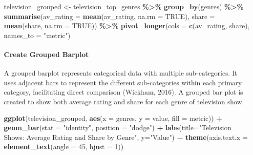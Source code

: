 \documentclass[
  b5paper]{book}
\newenvironment{Shaded}{\begin{snugshade}}{\end{snugshade}}
\newcommand{\AttributeTok}[1]{\textcolor[rgb]{0.13,0.29,0.53}{#1}}
\newcommand{\ConstantTok}[1]{\textcolor[rgb]{0.56,0.35,0.01}{#1}}
\newcommand{\DecValTok}[1]{\textcolor[rgb]{0.00,0.00,0.81}{#1}}
\newcommand{\FunctionTok}[1]{\textcolor[rgb]{0.13,0.29,0.53}{\textbf{#1}}}
\newcommand{\NormalTok}[1]{#1}
\newcommand{\OtherTok}[1]{\textcolor[rgb]{0.56,0.35,0.01}{#1}}
\newcommand{\SpecialCharTok}[1]{\textcolor[rgb]{0.81,0.36,0.00}{\textbf{#1}}}
\newcommand{\StringTok}[1]{\textcolor[rgb]{0.31,0.60,0.02}{#1}}
\begin{document}
\begin{Shaded}
\begin{Highlighting}[]
\NormalTok{television\_grouped }\OtherTok{\textless{}{-}}\NormalTok{ television\_top\_genres }\SpecialCharTok{\%\textgreater{}\%}
  \FunctionTok{group\_by}\NormalTok{(genres) }\SpecialCharTok{\%\textgreater{}\%}
  \FunctionTok{summarise}\NormalTok{(}\AttributeTok{av\_rating =} \FunctionTok{mean}\NormalTok{(av\_rating, }\AttributeTok{na.rm =} \ConstantTok{TRUE}\NormalTok{),}
            \AttributeTok{share =} \FunctionTok{mean}\NormalTok{(share, }\AttributeTok{na.rm =} \ConstantTok{TRUE}\NormalTok{)) }\SpecialCharTok{\%\textgreater{}\%}
  \FunctionTok{pivot\_longer}\NormalTok{(}\AttributeTok{cols =} \FunctionTok{c}\NormalTok{(av\_rating, share), }\AttributeTok{names\_to =} \StringTok{"metric"}\NormalTok{)}
\end{Highlighting}
\end{Shaded}

\hypertarget{create-grouped-barplot}{%
\paragraph*{Create Grouped Barplot}\label{create-grouped-barplot}}

A grouped barplot represents categorical data with multiple sub-categories. It uses adjacent bars to represent the different sub-categories within each primary category, facilitating direct comparison (Wickham, 2016). A grouped bar plot is created to show both average rating and share for each genre of television show.

\begin{Shaded}
\begin{Highlighting}[]
\FunctionTok{ggplot}\NormalTok{(television\_grouped, }\FunctionTok{aes}\NormalTok{(}\AttributeTok{x =}\NormalTok{ genres, }\AttributeTok{y =}\NormalTok{ value, }\AttributeTok{fill =}\NormalTok{ metric)) }\SpecialCharTok{+}
  \FunctionTok{geom\_bar}\NormalTok{(}\AttributeTok{stat =} \StringTok{"identity"}\NormalTok{, }\AttributeTok{position =} \StringTok{"dodge"}\NormalTok{) }\SpecialCharTok{+}
  \FunctionTok{labs}\NormalTok{(}\AttributeTok{title=}\StringTok{"Television Shows: Average Rating and Share by Genre"}\NormalTok{, }\AttributeTok{y=}\StringTok{"Value"}\NormalTok{) }\SpecialCharTok{+}
  \FunctionTok{theme}\NormalTok{(}\AttributeTok{axis.text.x =} \FunctionTok{element\_text}\NormalTok{(}\AttributeTok{angle =} \DecValTok{45}\NormalTok{, }\AttributeTok{hjust =} \DecValTok{1}\NormalTok{))}
\end{Highlighting}
\end{Shaded}
\end{document}
